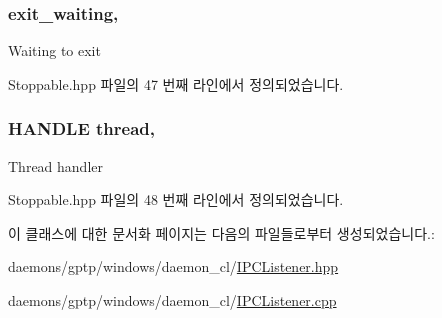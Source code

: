 \subsubsection[{\texorpdfstring{exit\+\_\+waiting}{exit_waiting}}]{ exit\+\_\+waiting\hspace{0.3cm}{\ttfamily [protected]}, {\ttfamily [inherited]}}\hypertarget{class_stoppable_ae0c3c0996c39797d309663cd3a2633d3}{}\label{class_stoppable_ae0c3c0996c39797d309663cd3a2633d3}
Waiting to exit 

Stoppable.\+hpp 파일의 47 번째 라인에서 정의되었습니다.

\subsubsection[{\texorpdfstring{thread}{thread}}]{\setlength{\rightskip}{0pt plus 5cm}H\+A\+N\+D\+LE thread\hspace{0.3cm}{\ttfamily [protected]}, {\ttfamily [inherited]}}\hypertarget{class_stoppable_adf8b62c27edd1f6b7641bb7bb7f60275}{}\label{class_stoppable_adf8b62c27edd1f6b7641bb7bb7f60275}
Thread handler 

Stoppable.\+hpp 파일의 48 번째 라인에서 정의되었습니다.



이 클래스에 대한 문서화 페이지는 다음의 파일들로부터 생성되었습니다.\+:\begin{DoxyCompactItemize}
\item 
daemons/gptp/windows/daemon\+\_\+cl/\hyperlink{_i_p_c_listener_8hpp}{I\+P\+C\+Listener.\+hpp}\item 
daemons/gptp/windows/daemon\+\_\+cl/\hyperlink{_i_p_c_listener_8cpp}{I\+P\+C\+Listener.\+cpp}\end{DoxyCompactItemize}

